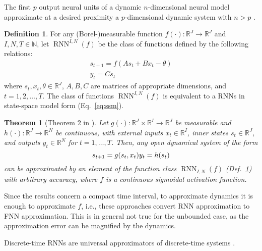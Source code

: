 \documentclass{article}
\newtheorem{theorem}{Theorem}
\theoremstyle{definition}
\newtheorem{definition}{Definition}
\theoremstyle{remark}
\begin{document}
The first $p$ output neural units of a dynamic $n$-dimensional neural model approximate at a desired proximity a $p$-dimensional dynamic system with $n > p$ \citep{kambhampati2000approximation}.

\begin{definition}\label{def:rnn}
For any (Borel-)measurable function \( f(\cdot): \mathbb{R}^J \rightarrow \mathbb{R}^J \) and \( I, N, T \in \mathbb{N} \), let \(\operatorname{RNN}^{I,N}(f) \) be the class of functions defined by the following relations:
\begin{align}  \label{eq:ssm}
s_{t+1} = f(A s_t + B x_t - \theta)\\
y_t = C s_t
\end{align}
where \( s_t, x_t, \theta \in \mathbb{R}^J \), \( A, B, C \) are matrices of appropriate dimensions, and \( t = 1, 2, \dots, T \).
The class of functions \( \operatorname{RNN}^{I,N}(f) \) is equivalent to a RNNs in state-space model form (Eq.~\ref{eq:ssm}).
\end{definition}


\begin{theorem}[Theorem 2 in \citep{schafer2006recurrent}]
Let \( g(\cdot): \mathbb{R}^J \times \mathbb{R}^I \to \mathbb{R}^J \) be measurable and \( h(\cdot): \mathbb{R}^J \to \mathbb{R}^N \) be continuous, with external inputs \( x_t \in \mathbb{R}^I \), inner states \( s_t \in \mathbb{R}^J \), and outputs \( y_t \in \mathbb{R}^N \) for \( t = 1, \dots, T \). Then, any open dynamical system of the form
\[
s_{t+1} = g(s_t, x_t) \\
y_t = h(s_t)
\]
can be approximated by an element of the function class \(\operatorname{RNN}_{I,N}(f)\) (Def.~\ref{def:rnn}) with arbitrary accuracy, where \( f \) is a continuous sigmoidal activation function. %
\end{theorem}

Since the results concern a compact time interval, to approximate dynamics it is enough to approximate $f$, i.e., these approaches convert RNN approximation to FNN approximation.
This is in general not true for the unbounded case, as the approximation error can be magnified by the dynamics.


Discrete-time RNNs are universal approximators of discrete-time systems \citep{aguiar2023}.
\end{document}
